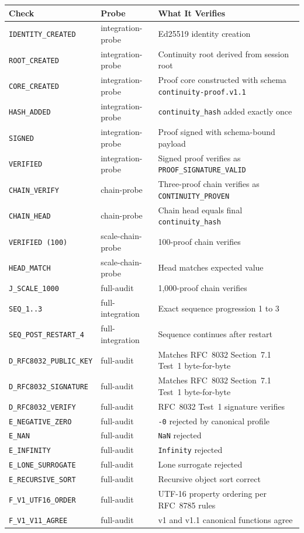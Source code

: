 \documentclass[11pt,a4paper]{article}
\begin{document}
{\small
\begin{longtable}{@{}p{4.5cm}p{4cm}p{6cm}@{}}
\toprule
Check & Probe & What It Verifies \\
\midrule
\endhead
\texttt{IDENTITY\_CREATED} & integration-probe & Ed25519 identity creation \\
\texttt{ROOT\_CREATED} & integration-probe & Continuity root derived from session root \\
\texttt{CORE\_CREATED} & integration-probe & Proof core constructed with schema \texttt{continuity-proof.v1.1} \\
\texttt{HASH\_ADDED} & integration-probe & \texttt{continuity\_hash} added exactly once \\
\texttt{SIGNED} & integration-probe & Proof signed with schema-bound payload \\
\texttt{VERIFIED} & integration-probe & Signed proof verifies as \texttt{PROOF\_SIGNATURE\_VALID} \\
\texttt{CHAIN\_VERIFY} & chain-probe & Three-proof chain verifies as \texttt{CONTINUITY\_PROVEN} \\
\texttt{CHAIN\_HEAD} & chain-probe & Chain head equals final \texttt{continuity\_hash} \\
\texttt{VERIFIED (100)} & scale-chain-probe & 100-proof chain verifies \\
\texttt{HEAD\_MATCH} & scale-chain-probe & Head matches expected value \\
\texttt{J\_SCALE\_1000} & full-audit & 1{,}000-proof chain verifies \\
\texttt{SEQ\_1..3} & full-integration & Exact sequence progression 1 to 3 \\
\texttt{SEQ\_POST\_RESTART\_4} & full-integration & Sequence continues after restart \\
\texttt{D\_RFC8032\_PUBLIC\_KEY} & full-audit & Matches RFC~8032 Section~7.1 Test~1 byte-for-byte \\
\texttt{D\_RFC8032\_SIGNATURE} & full-audit & Matches RFC~8032 Section~7.1 Test~1 byte-for-byte \\
\texttt{D\_RFC8032\_VERIFY} & full-audit & RFC~8032 Test~1 signature verifies \\
\texttt{E\_NEGATIVE\_ZERO} & full-audit & \texttt{-0} rejected by canonical profile \\
\texttt{E\_NAN} & full-audit & \texttt{NaN} rejected \\
\texttt{E\_INFINITY} & full-audit & \texttt{Infinity} rejected \\
\texttt{E\_LONE\_SURROGATE} & full-audit & Lone surrogate rejected \\
\texttt{E\_RECURSIVE\_SORT} & full-audit & Recursive object sort correct \\
\texttt{F\_V1\_UTF16\_ORDER} & full-audit & UTF-16 property ordering per RFC~8785 rules \\
\texttt{F\_V1\_V11\_AGREE} & full-audit & v1 and v1.1 canonical functions agree \\
\bottomrule
\end{longtable}
}
\end{document}
